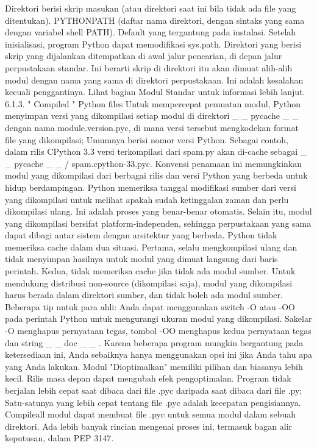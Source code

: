   \bullet  Direktori berisi skrip masukan (atau direktori saat ini bila tidak ada file yang ditentukan).  
  \bullet  PYTHONPATH (daftar nama direktori, dengan sintaks yang sama dengan variabel shell PATH).  
  \bullet  Default yang tergantung pada instalasi. 
Setelah inisialisasi, program Python dapat memodifikasi sys.path. Direktori yang berisi skrip yang dijalankan ditempatkan di awal jalur pencarian, di depan jalur perpustakaan standar. Ini berarti skrip di direktori itu akan dimuat alih-alih modul dengan nama yang sama di direktori perpustakaan. Ini adalah kesalahan kecuali penggantinya. Lihat bagian Modul Standar untuk informasi lebih lanjut.  
6.1.3.   " Compiled  "  Python files  
Untuk mempercepat pemuatan modul, Python menyimpan versi yang dikompilasi setiap modul di direktori    \_     \_  pycache   \_     \_   dengan nama module.version.pyc, di mana versi tersebut mengkodekan format file yang dikompilasi; Umumnya berisi nomor versi Python. Sebagai contoh, dalam rilis CPython 3.3 versi terkompilasi dari spam.py akan di-cache sebagai    \_     \_  pycache    \_     \_   / spam.cpython-33.pyc. Konvensi penamaan ini memungkinkan modul yang dikompilasi dari berbagai rilis dan versi Python yang berbeda untuk hidup berdampingan.  
Python memeriksa tanggal modifikasi sumber dari versi yang dikompilasi untuk melihat apakah sudah ketinggalan zaman dan perlu dikompilasi ulang. Ini adalah proses yang benar-benar otomatis. Selain itu, modul yang dikompilasi bersifat platform-independen, sehingga perpustakaan yang sama dapat dibagi antar sistem dengan arsitektur yang berbeda. Python tidak memeriksa cache dalam dua situasi. Pertama, selalu mengkompilasi ulang dan tidak menyimpan hasilnya untuk modul yang dimuat langsung dari baris perintah. Kedua, tidak memeriksa cache jika tidak ada modul sumber. Untuk mendukung distribusi non-source (dikompilasi saja), modul yang dikompilasi harus berada dalam direktori sumber, dan tidak boleh ada modul sumber. 
Beberapa tip untuk para ahli:  
  \bullet  Anda dapat menggunakan switch -O atau -OO pada perintah Python untuk mengurangi ukuran modul yang dikompilasi. Sakelar -O menghapus pernyataan tegas, tombol -OO menghapus kedua pernyataan tegas dan string    \_     \_  doc   \_     \_  . Karena beberapa program mungkin bergantung pada ketersediaan ini, Anda sebaiknya hanya menggunakan opsi ini jika Anda tahu apa yang Anda lakukan. Modul "Dioptimalkan" memiliki pilihan dan biasanya lebih kecil. Rilis masa depan dapat mengubah efek pengoptimalan. 
  \bullet  Program tidak berjalan lebih cepat saat dibaca dari file .pyc daripada saat dibaca dari file .py; Satu-satunya yang lebih cepat tentang file .pyc adalah kecepatan pengisiannya.  
  \bullet  Compileall modul dapat membuat file .pyc untuk semua modul dalam sebuah direktori.  
  \bullet  Ada lebih banyak rincian mengenai proses ini, termasuk bagan alir keputusan, dalam PEP 3147. 

